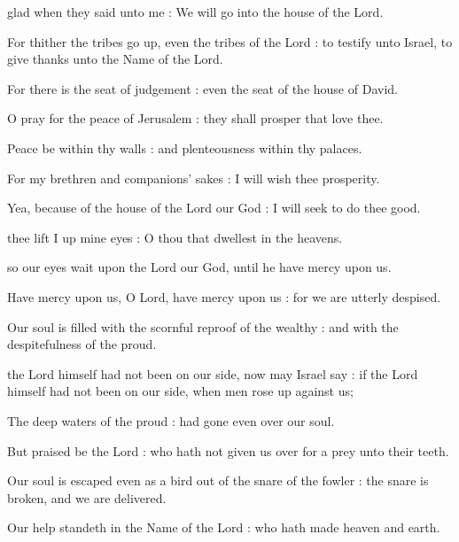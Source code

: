  glad when they said unto me : We will go into the house of the Lord.\par
{}
For thither the tribes go up, even the tribes of the Lord : to testify unto Israel, to give thanks unto the Name of the Lord.\par
{}For there is the seat of judgement : even the seat of the house of David.\par
{}O pray for the peace of Jerusalem : they shall prosper that love thee.\par
{}Peace be within thy walls : and plenteousness within thy palaces.\par
{}For my brethren and companions' sakes : I will wish thee prosperity.\par
{}Yea, because of the house of the Lord our God : I will seek to do thee good.\par


 thee lift I up mine eyes : O thou that dwellest in the heavens.\par
\noindent
so our eyes wait upon the Lord our God, until he have mercy upon us.\par
{}Have mercy upon us, O Lord, have mercy upon us : for we are utterly despised.\par
{}Our soul is filled with the scornful reproof of the wealthy : and with the despitefulness of the proud.\par


 the Lord himself had not been on our side, now may Israel say : if the Lord himself had not been on our side, when men rose up against us;\par
{}
The deep waters of the proud : had gone even over our soul.\par
{}But praised be the Lord : who hath not given us over for a prey unto their teeth.\par
{}Our soul is escaped even as a bird out of the snare of the fowler : the snare is broken, and we are delivered.\par
{}Our help standeth in the Name of the Lord : who hath made heaven and earth.\par

